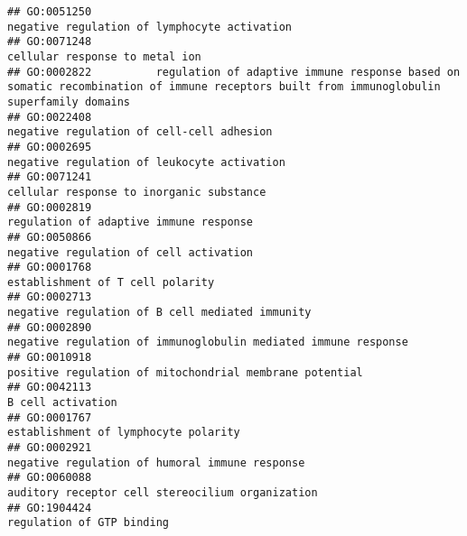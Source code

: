 \documentclass[
]{article}
\begin{document}
\begin{verbatim}
## GO:0051250                                                                                                     negative regulation of lymphocyte activation
## GO:0071248                                                                                                                   cellular response to metal ion
## GO:0002822          regulation of adaptive immune response based on somatic recombination of immune receptors built from immunoglobulin superfamily domains
## GO:0022408                                                                                                        negative regulation of cell-cell adhesion
## GO:0002695                                                                                                      negative regulation of leukocyte activation
## GO:0071241                                                                                                         cellular response to inorganic substance
## GO:0002819                                                                                                           regulation of adaptive immune response
## GO:0050866                                                                                                           negative regulation of cell activation
## GO:0001768                                                                                                                 establishment of T cell polarity
## GO:0002713                                                                                                  negative regulation of B cell mediated immunity
## GO:0002890                                                                                   negative regulation of immunoglobulin mediated immune response
## GO:0010918                                                                                          positive regulation of mitochondrial membrane potential
## GO:0042113                                                                                                                                B cell activation
## GO:0001767                                                                                                             establishment of lymphocyte polarity
## GO:0002921                                                                                                   negative regulation of humoral immune response
## GO:0060088                                                                                                 auditory receptor cell stereocilium organization
## GO:1904424                                                                                                                        regulation of GTP binding

\end{verbatim}
\end{document}
